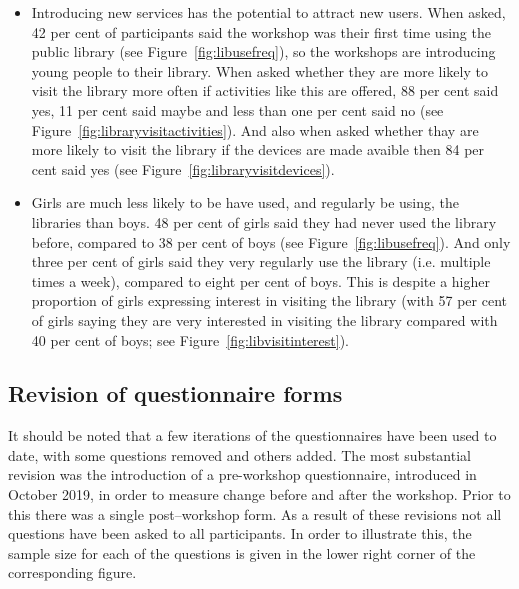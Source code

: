 \documentclass[12pt]{report} %
\begin{document}
\begin{itemize}
\item Introducing new services has the potential to attract new users. When asked, 42 per cent of participants said the workshop was their first time using the public library (see Figure~\ref{fig:libusefreq}), so the workshops are introducing young people to their library. When asked whether they are more likely to visit the library more often if activities like this are offered, 88 per cent said yes, 11 per cent said maybe and less than one per cent said no (see Figure~\ref{fig:libraryvisitactivities}). And also when asked whether thay are more likely to visit the library if the devices are made avaible then 84 per cent said yes (see Figure~\ref{fig:libraryvisitdevices}).

\item Girls are much less likely to be have used, and regularly be using, the libraries than boys. 48 per cent of girls said they had never used the library before, compared to 38 per cent of boys (see Figure~\ref{fig:libusefreq}). And only three per cent of girls said they very regularly use the library (i.e. multiple times a week), compared to eight per cent of boys. This is despite a higher proportion of girls expressing interest in visiting the library (with 57 per cent of girls saying they are very interested in visiting the library compared with 40 per cent of boys; see Figure~\ref{fig:libvisitinterest}). 
\end{itemize}
  
\subsection{Revision of questionnaire forms}
It should be noted that a few iterations of the questionnaires have been used to date, with some questions removed and others added. The most substantial revision was the introduction of a pre-workshop questionnaire, introduced in October 2019, in order to measure change before and after the workshop. Prior to this there was a single post--workshop form. As a result of these revisions not all questions have been asked to all participants. In order to illustrate this, the sample size for each of the questions is given in the lower right corner of the corresponding figure. 
\end{document}
